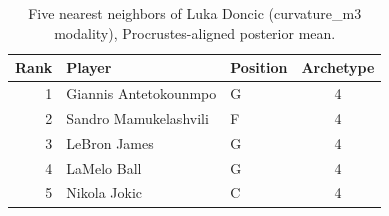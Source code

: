 \begin{table}[htbp]
  \centering\small
  \begin{tabular}{rllc}
    \toprule
    Rank & Player & Position & Archetype \\
    \midrule
    1 & Giannis Antetokounmpo & G & 4 \\
    2 & Sandro Mamukelashvili & F & 4 \\
    3 & LeBron James & G & 4 \\
    4 & LaMelo Ball & G & 4 \\
    5 & Nikola Jokic & C & 4 \\
    \bottomrule
  \end{tabular}
  \caption{Five nearest neighbors of Luka Doncic (curvature_m3 modality), Procrustes-aligned posterior mean.}
  \label{tab:Luka_Doncic_neighbors_curvature_m3}
\end{table}

